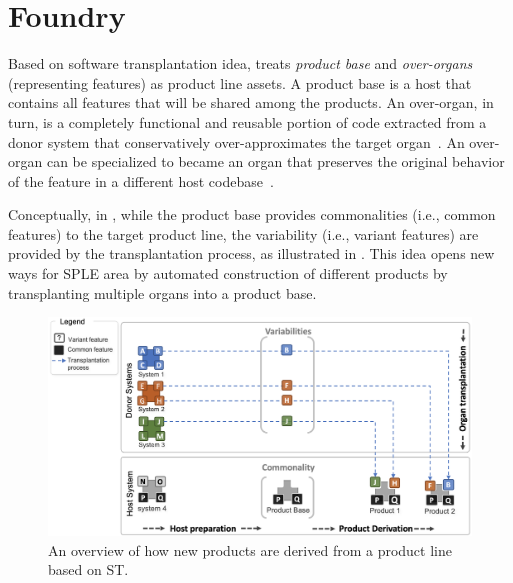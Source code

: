 \section{Foundry} 
\label{sec:approach}


Based on software transplantation idea, \FOUNDRY treats \emph{product base} and \emph{over-organs} (representing features) as product line assets. 
A product base is a host that contains all features that will be shared among the products. 
An over-organ, in turn, is a completely functional and reusable portion of code extracted from a donor system that conservatively over-approximates the target organ~\cite{Barr2015}. An over-organ can be specialized to became an organ that preserves the original behavior of the feature in a different host codebase~\cite{Barr2015}.

Conceptually, in \FOUNDRY, while the product base provides commonalities (i.e., common features) to the target product line, the variability (i.e., variant features) are provided by the transplantation process, as illustrated in . This idea opens new ways for SPLE area by automated construction of different products by transplanting multiple organs into a product base. 

\begin{figure}[t]
	\centering \includegraphics[width=\textwidth]{images/product_for_transplantation7.png}
	\centering 
	\caption{An overview of how new products are derived from a product line based on ST.}
	\label{fig:product_for_transplantation}
\end{figure} 


